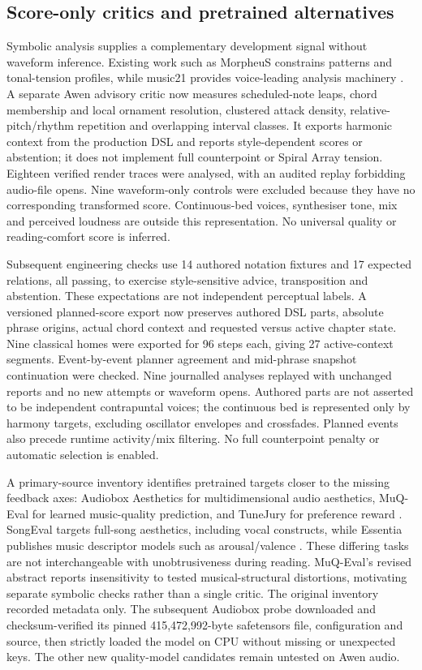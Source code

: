 \documentclass[11pt]{article}
\begin{document}
\subsection{Score-only critics and pretrained alternatives}
Symbolic analysis supplies a complementary development signal without waveform inference. Existing work such as MorpheuS constrains patterns and tonal-tension profiles, while music21 provides voice-leading analysis machinery \cite{morpheus,music21}. A separate Awen advisory critic now measures scheduled-note leaps, chord membership and local ornament resolution, clustered attack density, relative-pitch/rhythm repetition and overlapping interval classes. It exports harmonic context from the production DSL and reports style-dependent scores or abstention; it does not implement full counterpoint or Spiral Array tension. Eighteen verified render traces were analysed, with an audited replay forbidding audio-file opens. Nine waveform-only controls were excluded because they have no corresponding transformed score. Continuous-bed voices, synthesiser tone, mix and perceived loudness are outside this representation. No universal quality or reading-comfort score is inferred.

Subsequent engineering checks use 14 authored notation fixtures and 17 expected relations, all passing, to exercise style-sensitive advice, transposition and abstention. These expectations are not independent perceptual labels. A versioned planned-score export now preserves authored DSL parts, absolute phrase origins, actual chord context and requested versus active chapter state. Nine classical homes were exported for 96 steps each, giving 27 active-context segments. Event-by-event planner agreement and mid-phrase snapshot continuation were checked. Nine journalled analyses replayed with unchanged reports and no new attempts or waveform opens. Authored parts are not asserted to be independent contrapuntal voices; the continuous bed is represented only by harmony targets, excluding oscillator envelopes and crossfades. Planned events also precede runtime activity/mix filtering. No full counterpoint penalty or automatic selection is enabled.

A primary-source inventory identifies pretrained targets closer to the missing feedback axes: Audiobox Aesthetics for multidimensional audio aesthetics, MuQ-Eval for learned music-quality prediction, and TuneJury for preference reward \cite{audiobox,muqeval,tunejury}. SongEval targets full-song aesthetics, including vocal constructs, while Essentia publishes music descriptor models such as arousal/valence \cite{songeval,essentia}. These differing tasks are not interchangeable with unobtrusiveness during reading. MuQ-Eval's revised abstract reports insensitivity to tested musical-structural distortions, motivating separate symbolic checks rather than a single critic. The original inventory recorded metadata only. The subsequent Audiobox probe downloaded and checksum-verified its pinned 415,472,992-byte safetensors file, configuration and source, then strictly loaded the model on CPU without missing or unexpected keys. The other new quality-model candidates remain untested on Awen audio.
\end{document}
